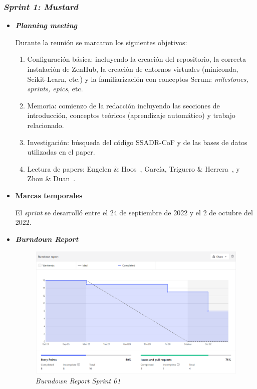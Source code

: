 \subsubsection{\textit{Sprint 1: Mustard}}

\begin{itemize}
	\item \textbf{\textit{Planning meeting}}
	
	Durante la reunión se marcaron los siguientes objetivos:
	
	\begin{enumerate}
		\item Configuración básica: incluyendo la creación del repositorio, la correcta instalación de ZenHub, la creación de entornos virtuales (miniconda, Scikit-Learn, etc.) y la familiarización con conceptos Scrum: \textit{milestones, sprints, epics}, etc.
		\item Memoria: comienzo de la redacción incluyendo las secciones de introducción, conceptos teóricos (aprendizaje automático) y trabajo relacionado.
		\item Investigación: búsqueda del código SSADR-CoF y de las bases de datos utilizadas en el paper.
		\item Lectura de papers: Engelen \& Hoos~\cite{engelen2020surveyOnSemiSupervised}, García, Triguero \& Herrera~\cite{triguero2015SelflabeledTechniques}, y Zhou \& Duan~\cite{zhou2021SemisupervisedRecommendationAttack}.
	\end{enumerate}
	
	\item \textbf{Marcas temporales}
	
	El \textit{sprint} se desarrolló entre el 24 de septiembre de 2022 y el 2 de octubre del 2022.
	
	\item \textbf{\textit{Burndown Report}}
	\begin{figure}[h]
		\caption[\textit{Sprint} 01: \textit{burndown report}]{\textit{Burndown Report Sprint 01}}
		\centering
		\includegraphics[width=\textwidth]{../img/anexos/bdr/s01_bdr}
	\end{figure}
	

\end{itemize}
